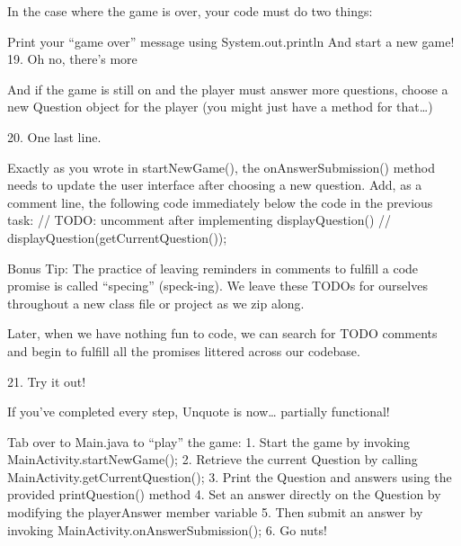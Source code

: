     In the case where the game is over, your code must do two things:

    Print your “game over” message using System.out.println
    And start a new game!
    19.
    Oh no, there’s more

    And if the game is still on and the player must answer more questions, choose a new Question object for the player (you might just have a method for that…)

    20.
    One last line.

    Exactly as you wrote in startNewGame(), the onAnswerSubmission() method needs to update the user interface after choosing a new question. Add, as a comment line, the following code immediately below the code in the previous task:
        // TODO: uncomment after implementing displayQuestion()
        // displayQuestion(getCurrentQuestion());

    Bonus Tip: The practice of leaving reminders in comments to fulfill a code promise is called “specing” (speck-ing). We leave these TODOs for ourselves throughout a new class file or project as we zip along.

    Later, when we have nothing fun to code, we can search for TODO comments and begin to fulfill all the promises littered across our codebase.

    21.
    Try it out!

    If you’ve completed every step, Unquote is now… partially functional!

    Tab over to Main.java to “play” the game:
        1. Start the game by invoking MainActivity.startNewGame();
        2. Retrieve the current Question by calling MainActivity.getCurrentQuestion();
        3. Print the Question and answers using the provided printQuestion() method
        4. Set an answer directly on the Question by modifying the playerAnswer member variable
        5. Then submit an answer by invoking MainActivity.onAnswerSubmission();
        6. Go nuts!